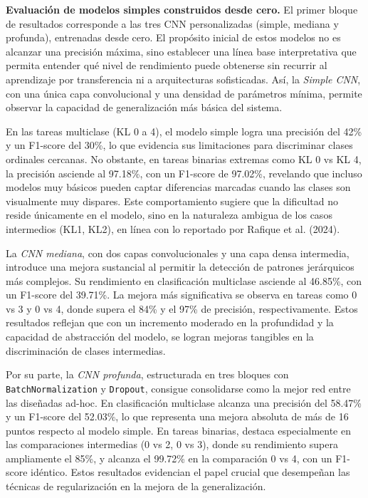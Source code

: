 \textbf{Evaluación de modelos simples construidos desde cero.}
El primer bloque de resultados corresponde a las tres CNN personalizadas (simple, mediana y profunda), entrenadas desde cero. El propósito inicial de estos modelos no es alcanzar una precisión máxima, sino establecer una línea base interpretativa que permita entender qué nivel de rendimiento puede obtenerse sin recurrir al aprendizaje por transferencia ni a arquitecturas sofisticadas. Así, la \emph{Simple CNN}, con una única capa convolucional y una densidad de parámetros mínima, permite observar la capacidad de generalización más básica del sistema.

En las tareas multiclase (KL 0 a 4), el modelo simple logra una precisión del 42\% y un F1-score del 30\%, lo que evidencia sus limitaciones para discriminar clases ordinales cercanas. No obstante, en tareas binarias extremas como KL 0 vs KL 4, la precisión asciende al 97.18\%, con un F1-score de 97.02\%, revelando que incluso modelos muy básicos pueden captar diferencias marcadas cuando las clases son visualmente muy dispares. Este comportamiento sugiere que la dificultad no reside únicamente en el modelo, sino en la naturaleza ambigua de los casos intermedios (KL1, KL2), en línea con lo reportado por Rafique et al. (2024).

La \emph{CNN mediana}, con dos capas convolucionales y una capa densa intermedia, introduce una mejora sustancial al permitir la detección de patrones jerárquicos más complejos. Su rendimiento en clasificación multiclase asciende al 46.85\%, con un F1-score del 39.71\%. La mejora más significativa se observa en tareas como 0 vs 3 y 0 vs 4, donde supera el 84\% y el 97\% de precisión, respectivamente. Estos resultados reflejan que con un incremento moderado en la profundidad y la capacidad de abstracción del modelo, se logran mejoras tangibles en la discriminación de clases intermedias.

Por su parte, la \emph{CNN profunda}, estructurada en tres bloques con \texttt{BatchNormalization} y \texttt{Dropout}, consigue consolidarse como la mejor red entre las diseñadas ad-hoc. En clasificación multiclase alcanza una precisión del 58.47\% y un F1-score del 52.03\%, lo que representa una mejora absoluta de más de 16 puntos respecto al modelo simple. En tareas binarias, destaca especialmente en las comparaciones intermedias (0 vs 2, 0 vs 3), donde su rendimiento supera ampliamente el 85\%, y alcanza el 99.72\% en la comparación 0 vs 4, con un F1-score idéntico. Estos resultados evidencian el papel crucial que desempeñan las técnicas de regularización en la mejora de la generalización.

